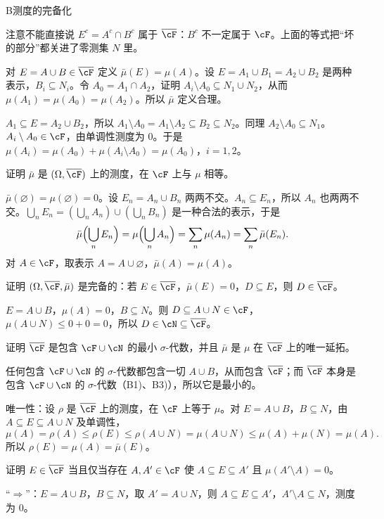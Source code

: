 \begin{probleme}{B}{测度的完备化}
\begin{questions}
\begin{solution}
注意不能直接说 $E^c=A^c\cap B^c$ 属于 $\overline\cF$：$B^c$ 不一定属于 $\cF$。上面的等式把“坏的部分”都关进了零测集 $N$ 里。
\end{solution}
\item 对 $E=A\cup B\in\overline\cF$ 定义 $\bar\mu(E)=\mu(A)$。设 $E=A_1\cup B_1=A_2\cup B_2$ 是两种表示，$B_i\subseteq N_i$。令 $A_0=A_1\cap A_2$，证明 $A_i\setminus A_0\subseteq N_1\cup N_2$，从而 $\mu(A_1)=\mu(A_0)=\mu(A_2)$。所以 $\bar\mu$ 定义合理。
\begin{solution}
$A_1\subseteq E=A_2\cup B_2$，所以 $A_1\setminus A_0=A_1\setminus A_2\subseteq B_2\subseteq N_2$。同理 $A_2\setminus A_0\subseteq N_1$。$A_i\setminus A_0\in\cF$，由单调性测度为 $0$。于是 $\mu(A_i)=\mu(A_0)+\mu(A_i\setminus A_0)=\mu(A_0)$，$i=1,2$。
\end{solution}
\item 证明 $\bar\mu$ 是 $(\Omega,\overline\cF)$ 上的测度，在 $\cF$ 上与 $\mu$ 相等。
\begin{solution}
$\bar\mu(\varnothing)=\mu(\varnothing)=0$。设 $E_n=A_n\cup B_n$ 两两不交。$A_n\subseteq E_n$，所以 $A_n$ 也两两不交。$\bigcup_nE_n=(\bigcup_nA_n)\cup(\bigcup_nB_n)$ 是一种合法的表示，于是
\[
\bar\mu\Bigl(\bigcup_nE_n\Bigr)=\mu\Bigl(\bigcup_nA_n\Bigr)=\sum_n\mu(A_n)=\sum_n\bar\mu(E_n).
\]
对 $A\in\cF$，取表示 $A=A\cup\varnothing$，$\bar\mu(A)=\mu(A)$。
\end{solution}
\item 证明 $(\Omega,\overline\cF,\bar\mu)$ 是完备的：若 $E\in\overline\cF$，$\bar\mu(E)=0$，$D\subseteq E$，则 $D\in\overline\cF$。
\begin{solution}
$E=A\cup B$，$\mu(A)=0$，$B\subseteq N$。则 $D\subseteq A\cup N\in\cF$，$\mu(A\cup N)\leqslant0+0=0$，所以 $D\in\cN\subseteq\overline\cF$。
\end{solution}
\item 证明 $\overline\cF$ 是包含 $\cF\cup\cN$ 的最小 $\sigma$-代数，并且 $\bar\mu$ 是 $\mu$ 在 $\overline\cF$ 上的唯一延拓。
\begin{solution}
任何包含 $\cF\cup\cN$ 的 $\sigma$-代数都包含一切 $A\cup B$，从而包含 $\overline\cF$；而 $\overline\cF$ 本身是包含 $\cF\cup\cN$ 的 $\sigma$-代数（B1)、B3)），所以它是最小的。

唯一性：设 $\rho$ 是 $\overline\cF$ 上的测度，在 $\cF$ 上等于 $\mu$。对 $E=A\cup B$，$B\subseteq N$，由 $A\subseteq E\subseteq A\cup N$ 及单调性，
\[
\mu(A)=\rho(A)\leqslant\rho(E)\leqslant\rho(A\cup N)=\mu(A\cup N)\leqslant\mu(A)+\mu(N)=\mu(A).
\]
所以 $\rho(E)=\mu(A)=\bar\mu(E)$。
\end{solution}
\item 证明 $E\in\overline\cF$ 当且仅当存在 $A,A'\in\cF$ 使 $A\subseteq E\subseteq A'$ 且 $\mu(A'\setminus A)=0$。
\begin{solution}
“$\Rightarrow$”：$E=A\cup B$，$B\subseteq N$，取 $A'=A\cup N$，则 $A\subseteq E\subseteq A'$，$A'\setminus A\subseteq N$，测度为 $0$。


\end{solution}
\end{questions}
\end{probleme}
